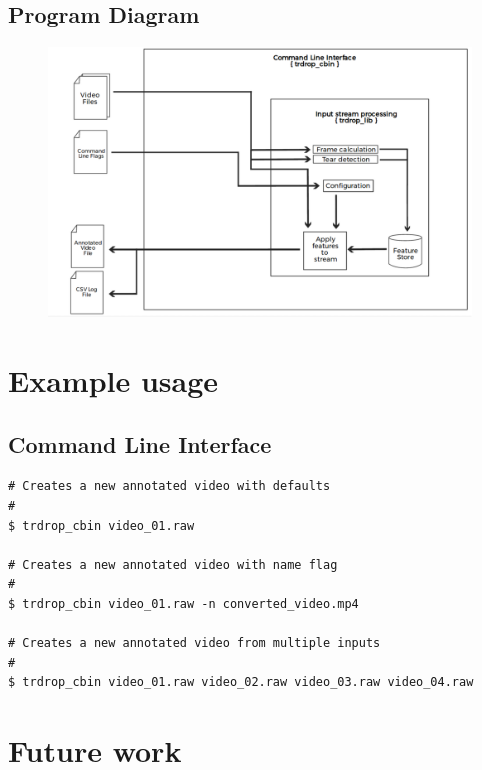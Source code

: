 \documentclass[titlepage]{article}
\begin{document}
\subsection{Program Diagram}

\begin{figure}[H]
\hspace{-30mm}
\includegraphics[width=500pt,left]{../../images/trdrop_diagram.eps}
\end{figure}

\section{Example usage}

\subsection{Command Line Interface}

\begin{verbatim}
# Creates a new annotated video with defaults
#
$ trdrop_cbin video_01.raw

# Creates a new annotated video with name flag
#
$ trdrop_cbin video_01.raw -n converted_video.mp4

# Creates a new annotated video from multiple inputs
#
$ trdrop_cbin video_01.raw video_02.raw video_03.raw video_04.raw
\end{verbatim}


\section{Future work}
\end{document}
